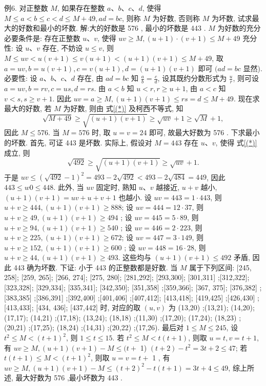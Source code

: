 例6. 对正整数 $M$, 如果存在整数 $a 、 b 、 c 、 d$, 使得 $M \leqslant a<b \leqslant c<d \leqslant M+49, a d=b c$, 则称 $M$ 为好数, 否则称 $M$ 为坏数, 试求最大的好数和最小的坏数.
解:大的好数是 576 , 最小的坏数是 443 .
$M$ 为好数的充分必要条件是: 存在正整数 $u 、 v$, 使得 $u v \geqslant M,(u+1) \cdot (v+1) \leqslant M+49 \label{(*)}$
充分性: 设 $u 、 v$ 存在, 不妨设 $u \leqslant v$, 则 $M \leqslant u v<u(v+1) \leqslant v(u+1)< (u+1)(v+1) \leqslant M+49$, 取 $a=u v, b=u(v+1), c=v(u+1), d= (u+1)(v+1)$ 即可 $(a d=b c$ 显然).
必要性: 设 $a 、 b 、 c 、 d$ 存在, 由 $a d=b c$ 知 $\frac{a}{b}=\frac{c}{d}$, 设其既约分数形式为 $\frac{u}{r}$, 则可设 $a=u v, b=r v, c=u s, d=r s$. 由 $a<b$ 知 $u<r, r \geqslant u+1$, 由 $a<c$ 知 $v<s, s \geqslant v+1$.
因此 $u v=a \geqslant M,(u+1)(v+1) \leqslant r s=d \leqslant M+49$.
现在求最大的好数, 若 $M$ 为好数, 则由 式\ref{(*)} 及柯西不等式, 知
$$
\sqrt{M+49} \geqslant \sqrt{(u+1)(v+1)} \geqslant \sqrt{u v}+1 \geqslant \sqrt{M}+1,
$$
因此 $M \leqslant 576$. 当 $M=576$ 时, 取 $u=v=24$ 即可, 故最大好数为 576 .
下求最小的坏数.
首先, 可证 443 是坏数.
实际上, 假设对 $M=443$ 存在 $u 、 v$, 使得 式\ref{(*)} 成立, 则
$$
\sqrt{492} \geqslant \sqrt{(u+1)(v+1)} \geqslant \sqrt{u v}+1 .
$$
于是 $u v \leqslant(\sqrt{492}-1)^2=493-2 \sqrt{492}<493-2 \sqrt{484}=449$, 因此 $443 \leqslant w 0 \leqslant 448$.
此外, 当 $u v$ 固定时, 熟知 $u 、 v$ 越接近, $u+v$ 越小, $(u+1)(v+1)=u v+ u+v+1$ 也越小.
设 $u v=443=1 \cdot 443$, 则 $u+v \geqslant 444,(u+1)(v+1) \geqslant 888$;
设 $u v=444=12 \cdot 37$, 则 $u+v \geqslant 49,(u+1)(v+1) \geqslant 494$ ;
设 $u v=445=5 \cdot 89$, 则 $u+v \geqslant 94,(u+1)(v+1) \geqslant 540$ ;
设 $u v=446=2 \cdot 223$, 则 $u+v \geqslant 225,(u+1)(v+1) \geqslant 672$;
设 $u v=447=3 \cdot 149$, 则 $u+v \geqslant 152,(u+1)(v+1) \geqslant 600$ ;
设 $u v=448=16 \cdot 28$, 则 $u+v \geqslant 44,(u+1)(v+1) \geqslant 493$.
这些均与 $(u+1)(v+1) \leqslant 492$ 矛盾, 因此 443 确为坏数.
下证: 小于 443 的正整数都是好数.
当 $M$ 属于下列区间: [245, 258]; [259, 265]; [266, 274]; [275, 280];
[281,292]; [293,300]; [301,311] ;[312,322]; [323,328]; [329,334]; 
[335,341]; [342,350]; [351,358] ;[359,366]; [367, 375];
[376,382] ;[383,385] ;[386,391] ;[392,400] ;[401,406] ;[407,412]; 
[413,418]; [419,425] ;[426,430] ;[413,433]; [434, 436];
[437,442] 时, 对应的取 $(u, v)$ 为 (13,20) ;(13,21); (14,20); (17,17);
(14,21) ;(17,18); (13,24); (18,18) ;(11,30) ;(17,20); (17,24);
(18,23) ;(20,21) ;(17,25); (18,24) ;(14,31) ;(20,22) ;(17,26).
最后对 $1 \leqslant M \leqslant 245$, 设 $t^2 \leqslant M<(t+1)^2$, 则 $1 \leqslant t \leqslant 15$. 若 $t^2 \leqslant M< t(t+1)$, 则取 $u=t, v=t+1$, 有 $u v \geqslant M,(u+1)(v+1)-M \leqslant(t+$ 1) $(t+2)-t^2=3 t+2 \leqslant 47$; 若 $t(t+1) \leqslant M<(t+1)^2$, 则取 $u=v=t+$ 1 , 有 $u v \geqslant M,(u+1)(v+1)-M \leqslant(t+2)^2-t(t+1)=3 t+4 \leqslant 49$, 综上所述, 最大好数为 576 ,最小坏数为 443 .


